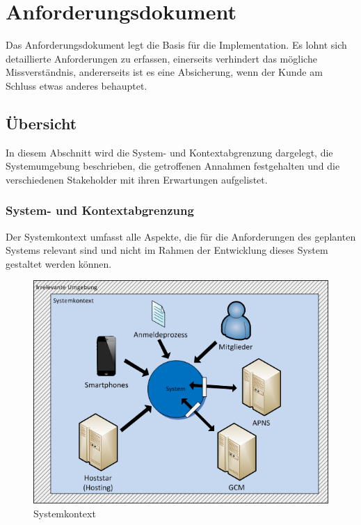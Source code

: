%
%

\chapter{Anforderungsdokument}\label{chap.anforderungsdokument}

Das Anforderungsdokument legt die Basis für die Implementation. Es lohnt sich detaillierte Anforderungen zu erfassen, einerseits verhindert das mögliche Missverständnis, andererseits ist es eine Absicherung, wenn der Kunde am Schluss etwas anderes behauptet.

\section{Übersicht}\label{anf_uebersicht}

In diesem Abschnitt  wird die System- und Kontextabgrenzung dargelegt, die Systemumgebung beschrieben, die getroffenen Annahmen festgehalten und die verschiedenen Stakeholder mit ihren Erwartungen aufgelistet.

\subsection{System- und Kontextabgrenzung}\label{systemabgrenzung}
Der Systemkontext umfasst alle Aspekte, die für die Anforderungen des geplanten Systems relevant sind und nicht im Rahmen der Entwicklung dieses System gestaltet werden können.\cite{req_eng_book} 
\begin{figure}[h]
\includegraphics{images/visio/systemkontext.png}
\caption{Systemkontext}
\label{fig:systemkontext}
\end{figure}

